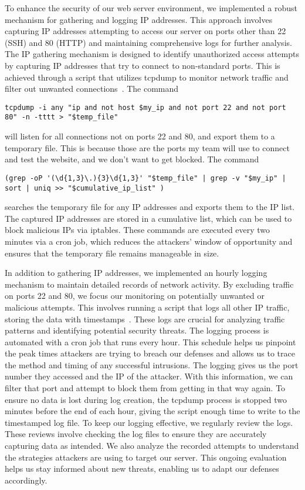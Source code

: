 To enhance the security of our web server environment, we implemented a robust mechanism for gathering and logging IP addresses. This approach involves capturing IP addresses attempting to access our server on ports other than 22 (SSH) and 80 (HTTP) and maintaining comprehensive logs for further analysis. The IP gathering mechanism is designed to identify unauthorized access attempts by capturing IP addresses that try to connect to non-standard ports. This is achieved through a script that utilizes tcpdump to monitor network traffic and filter out unwanted connections~\cite{TechTarget_Net}. The command

\begin{lstlisting}
tcpdump -i any "ip and not host $my_ip and not port 22 and not port 80" -n -tttt > "$temp_file"
\end{lstlisting}

will listen for all connections not on ports 22 and 80, and export them to a temporary file. This is because those are the ports my team will use to connect and test the website, and we don't want to get blocked. The command

\begin{lstlisting}
(grep -oP '(\d{1,3}\.){3}\d{1,3}' "$temp_file" | grep -v "$my_ip" | sort | uniq >> "$cumulative_ip_list" )
\end{lstlisting}

searches the temporary file for any IP addresses and exports them to the IP list. The captured IP addresses are stored in a cumulative list, which can be used to block malicious IPs via iptables. These commands are executed every two minutes via a cron job, which reduces the attackers' window of opportunity and ensures that the temporary file remains manageable in size.

In addition to gathering IP addresses, we implemented an hourly logging mechanism to maintain detailed records of network activity. By excluding traffic on ports 22 and 80, we focus our monitoring on potentially unwanted or malicious attempts. This involves running a script that logs all other IP traffic, storing the data with timestamps~\cite{Schwartz_TCPDUMP}. These logs are crucial for analyzing traffic patterns and identifying potential security threats. The logging process is automated with a cron job that runs every hour. This schedule helps us pinpoint the peak times attackers are trying to breach our defenses and allows us to trace the method and timing of any successful intrusions. The logging gives us the port number they accessed and the IP of the attacker. With this information, we can filter that port and attempt to block them from getting in that way again. To ensure no data is lost during log creation, the tcpdump process is stopped two minutes before the end of each hour, giving the script enough time to write to the timestamped log file. To keep our logging effective, we regularly review the logs. These reviews involve checking the log files to ensure they are accurately capturing data as intended. We also analyze the recorded attempts to understand the strategies attackers are using to target our server. This ongoing evaluation helps us stay informed about new threats, enabling us to adapt our defenses accordingly.
